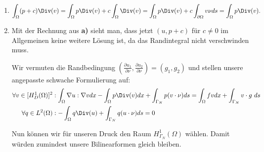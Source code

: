 \begin{solution}

\phantom{}

\begin{enumerate}[label = \textbf{\alph*)}]

\item

\begin{align*}
  \int_\Omega (p + c)\Div(v) = \int_\Omega p\Div(v) + c\int_\Omega \Div(v) =
  \int_\Omega p\Div(v) + c\int_{\partial\Omega} v \nu ds = \int_\Omega p\Div(v).
\end{align*}

\item
Mit der Rechnung aus \textbf{a)} sieht man, dass jetzt $(u, p + c)$ für $c \neq 0$ im Allgemeinen keine weitere Lösung ist, da das Randintegral nicht verschwinden muss.

Wir vermuten die Randbedingung $(\frac{\partial u_1}{\partial \nu}, \frac{\partial u_2}{\partial \nu}) = (g_1, g_2)$ und stellen
unsere angepasste schwache Formulierung auf:
\begin{align*}
  \forall v \in [H_D^1(\Omega)]^2&: \int_\Omega \nabla u : \nabla v dx - \int_\Omega p \Div(v) dx + \int_{\Gamma_N} p (v \cdot \nu) ds
  = \int_\Omega fv dx + \int_{\Gamma_N} v\cdot g~ ds\\
  \forall q \in L^2(\Omega)&:  - \int_\Omega q\Div(u) + \int_{\Gamma_N} q (u \cdot \nu) ds  = 0
\end{align*}

Nun können wir für unseren Druck den Raum $H^1_{\Gamma_N}(\Omega)$ wählen. Damit würden zumindest unsere Bilinearformen gleich bleiben.
\end{enumerate}


\end{solution}

